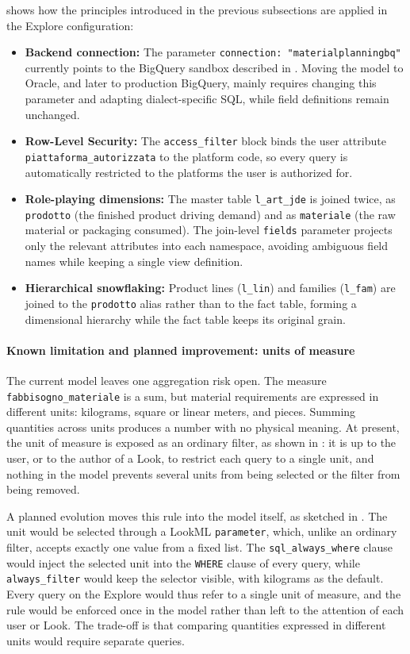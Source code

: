  shows how the principles introduced in the previous subsections are applied in the Explore configuration:
\begin{itemize}
    \item \textbf{Backend connection:} The parameter \texttt{connection: "materialplanningbq"} currently points to the BigQuery sandbox described in . Moving the model to Oracle, and later to production BigQuery, mainly requires changing this parameter and adapting dialect-specific SQL, while field definitions remain unchanged.
    \item \textbf{Row-Level Security:} The \texttt{access\_filter} block binds the user attribute \texttt{piattaforma\_autorizzata} to the platform code, so every query is automatically restricted to the platforms the user is authorized for.
    \item \textbf{Role-playing dimensions:} The master table \texttt{l\_art\_jde} is joined twice, as \texttt{prodotto} (the finished product driving demand) and as \texttt{materiale} (the raw material or packaging consumed). The join-level \texttt{fields} parameter projects only the relevant attributes into each namespace, avoiding ambiguous field names while keeping a single view definition.
    \item \textbf{Hierarchical snowflaking:} Product lines (\texttt{l\_lin}) and families (\texttt{l\_fam}) are joined to the \texttt{prodotto} alias rather than to the fact table, forming a dimensional hierarchy while the fact table keeps its original grain.
\end{itemize}

\paragraph{Known limitation and planned improvement: units of measure}
The current model leaves one aggregation risk open. The measure \texttt{fabbisogno\_materiale} is a sum, but material requirements are expressed in different units: kilograms, square or linear meters, and pieces. Summing quantities across units produces a number with no physical meaning. At present, the unit of measure is exposed as an ordinary filter, as shown in : it is up to the user, or to the author of a Look, to restrict each query to a single unit, and nothing in the model prevents several units from being selected or the filter from being removed.

A planned evolution moves this rule into the model itself, as sketched in . The unit would be selected through a LookML \texttt{parameter}, which, unlike an ordinary filter, accepts exactly one value from a fixed list. The \texttt{sql\_always\_where} clause would inject the selected unit into the \texttt{WHERE} clause of every query, while \texttt{always\_filter} would keep the selector visible, with kilograms as the default. Every query on the Explore would thus refer to a single unit of measure, and the rule would be enforced once in the model rather than left to the attention of each user or Look. The trade-off is that comparing quantities expressed in different units would require separate queries.

